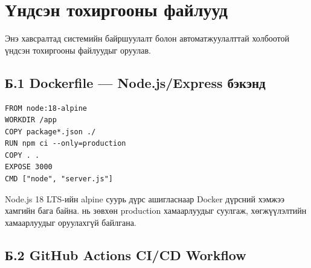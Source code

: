 \chapter{Үндсэн тохиргооны файлууд}
\label{AppendixB}
\pagecolor{white}

Энэ хавсралтад системийн байршуулалт болон автоматжуулалттай холбоотой үндсэн тохиргооны файлуудыг оруулав.


\section*{Б.1 Dockerfile — Node.js/Express бэкэнд}

\begin{lstlisting}[language={}, caption={backend/Dockerfile}]
FROM node:18-alpine
WORKDIR /app
COPY package*.json ./
RUN npm ci --only=production
COPY . .
EXPOSE 3000
CMD ["node", "server.js"]
\end{lstlisting}

Node.js 18 LTS-ийн alpine суурь дүрс ашигласнаар Docker дүрсний хэмжээ хамгийн бага байна.  нь зөвхөн production хамаарлуудыг суулгаж, хөгжүүлэлтийн хамаарлуудыг оруулахгүй байлгана.


\section*{Б.2 GitHub Actions CI/CD Workflow}

